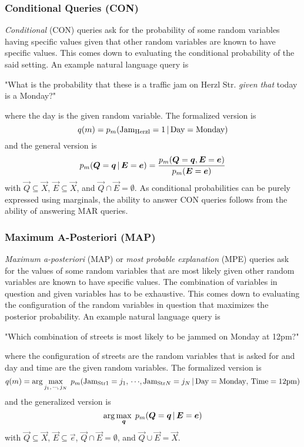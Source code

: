 			\subsubsection{Conditional Queries (CON)}
				\emph{Conditional} (CON) queries ask for the probability of some random variables having specific values given that other random variables are known to have specific values. This comes down to evaluating the conditional probability of the said setting. An example natural language query is
				\begin{center}
					"What is the probability that these is a traffic jam on Herzl Str. \emph{given that} today is a Monday?"
				\end{center}
				where the day is the given random variable. The formalized version is
				\begin{equation}
					q(m) = p_m(\text{Jam}_\text{Herzl} = 1 \,\vert\, \text{Day} = \text{Monday})
				\end{equation}
				and the general version is
				\begin{equation}
					p_m(\bm{Q} = \bm{q} \,\vert\, \bm{E} = \bm{e}) = \frac{p_m(\bm{Q} = \bm{q}, \bm{E} = \bm{e})}{p_m(\bm{E} = \bm{e})}
				\end{equation}
				with \( \vec{Q} \subseteq \vec{X} \), \( \vec{E} \subseteq \vec{X} \), and \( \vec{Q} \cap \vec{E} = \emptyset \). As conditional probabilities can be purely expressed using marginals, the ability to answer CON queries follows from the ability of answering MAR queries.

			\subsubsection{Maximum A-Posteriori (MAP)}
				\emph{Maximum a-posteriori} (MAP) or \emph{most probable explanation} (MPE) queries ask for the values of some random variables that are most likely given other random variables are known to have specific values. The combination of variables in question and given variables has to be exhaustive. This comes down to evaluating the configuration of the random variables in question that maximizes the posterior probability. An example natural language query is
				\begin{center}
					"Which combination of streets is most likely to be jammed on Monday at 12pm?"
				\end{center}
				where the configuration of streets are the random variables that is asked for and day and time are the given random variables. The formalized version is
				\begin{equation}
					q(m) = \arg\max_{j_1,\,\cdots\!,\,j_N} \; p_m(\text{Jam}_{\text{Str}1} = j_1,\,\cdots\!,\text{Jam}_{\text{Str}N} = j_N \,\vert\, \text{Day} = \text{Monday},\, \text{Time} = \text{12pm})
				\end{equation}
				and the generalized version is
				\begin{equation}
					\arg\max_{\bm{q}} \; p_m(\bm{Q} = \bm{q} \,\vert\, \bm{E} = \bm{e})
				\end{equation}
				with \( \vec{Q} \subseteq \vec{X} \), \( \vec{E} \subseteq \vec{e} \), \( \vec{Q} \cap \vec{E} = \emptyset \), and \( \vec{Q} \cup \vec{E} = \vec{X} \).

